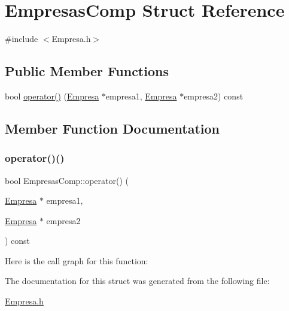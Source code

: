 \hypertarget{struct_empresas_comp}{}\section{Empresas\+Comp Struct Reference}
\label{struct_empresas_comp}


{\ttfamily \#include $<$Empresa.\+h$>$}

\subsection*{Public Member Functions}
\begin{DoxyCompactItemize}
\item 
bool \mbox{\hyperlink{struct_empresas_comp_a65f437399b6aa939ee84611a69ee0ad0}{operator()}} (\mbox{\hyperlink{class_empresa}{Empresa}} $\ast$empresa1, \mbox{\hyperlink{class_empresa}{Empresa}} $\ast$empresa2) const
\end{DoxyCompactItemize}


\subsection{Member Function Documentation}
\mbox{\label{struct_empresas_comp_a65f437399b6aa939ee84611a69ee0ad0}} 
\subsubsection{\texorpdfstring{operator()()}{operator()()}}
{\footnotesize\ttfamily bool Empresas\+Comp\+::operator() (\begin{DoxyParamCaption}\item[{\mbox{\hyperlink{class_empresa}{Empresa}} $\ast$}]{empresa1,  }\item[{\mbox{\hyperlink{class_empresa}{Empresa}} $\ast$}]{empresa2 }\end{DoxyParamCaption}) const\hspace{0.3cm}{\ttfamily [inline]}}

Here is the call graph for this function\+:


The documentation for this struct was generated from the following file\+:\begin{DoxyCompactItemize}
\item 
\mbox{\hyperlink{_empresa_8h}{Empresa.\+h}}\end{DoxyCompactItemize}
